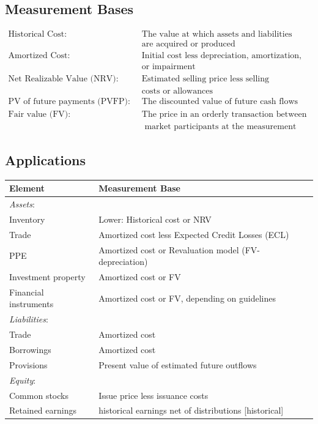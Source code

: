 \documentclass[12pt]{article}
\begin{document}
\subsection{Measurement Bases}
\begin{tcolorbox}
\begin{align*}
	\text{Historical Cost:}\quad & \text{The value at which assets and liabilities} \\
	\quad & \text{are acquired or produced} \\
	\text{Amortized Cost:} \quad & \text{Initial cost less depreciation, amortization,} \\
	\quad & \text{or impairment} \\
	\text{Net Realizable Value (NRV):} \quad & \text{Estimated selling price less selling } \\
	\quad & \text{costs or allowances} \\
	\text{PV of future payments (PVFP):} \quad & \text{The discounted value of future cash flows} \\
	\text{Fair value (FV):} \quad & \text{The price in an orderly transaction between} \\
	\quad & \text{ market participants at the measurement date}
\end{align*}
\end{tcolorbox}

\subsection{Applications}
\begin{tcolorbox}
\begin{tabularx}{\textwidth}{|l|X|}
	\hline
	\textbf{Element} & \textbf{Measurement Base} \\
	\hline
	\textit{Assets}: & \\
	Inventory & Lower: Historical cost or NRV \\
	Trade & Amortized cost less Expected Credit Losses (ECL)\\
	PPE &  Amortized cost or Revaluation model (FV- depreciation) \\
	Investment property & Amortized cost or FV \\
	Financial instruments & Amortized cost or FV, depending on guidelines \\
	\hline
	\textit{Liabilities}: & \\
	Trade & Amortized cost \\	
	Borrowings & Amortized cost \\
	Provisions & Present value of estimated future outflows \\
	\hline
	\textit{Equity}: & \\
	Common stocks & Issue price less issuance costs \\
	Retained earnings & historical earnings net of distributions [historical]\\
	\hline
\end{tabularx}
\end{tcolorbox}	
\end{document}
